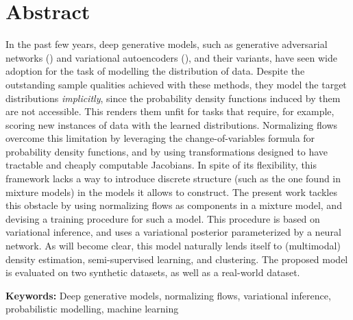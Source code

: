 \section*{Abstract}


In the past few years, deep generative models, such as generative adversarial networks
(\autocite{GAN}) and variational autoencoders (\autocite{vaepaper}), and their variants,
have seen wide adoption for the task of modelling the distribution of data.
Despite the outstanding sample qualities achieved with these methods,
they model the target distributions \emph{implicitly}, since the probability
density functions induced by them are not accessible. This renders them unfit for
tasks that require, for example, scoring new instances of data with the learned
distributions. Normalizing flows overcome this limitation by leveraging the
change-of-variables formula for probability density functions, and by using
transformations designed to have tractable and cheaply computable Jacobians. In
spite of its flexibility, this framework lacks a way to introduce discrete
structure (such as the one found in mixture models) in the models it allows to
construct. The present work tackles this obstacle by using normalizing flows as
components in a mixture model, and devising a training procedure for such a model.
This procedure is based on variational inference, and uses a variational posterior
parameterized by a neural network. As will become clear, this model naturally
lends itself to (multimodal) density estimation, semi-supervised learning, and
clustering. The proposed model is evaluated on two synthetic datasets, as well
as a real-world dataset.
\vfill

\textbf{\Large Keywords:} Deep generative models, normalizing flows, variational
inference, probabilistic modelling, machine learning
